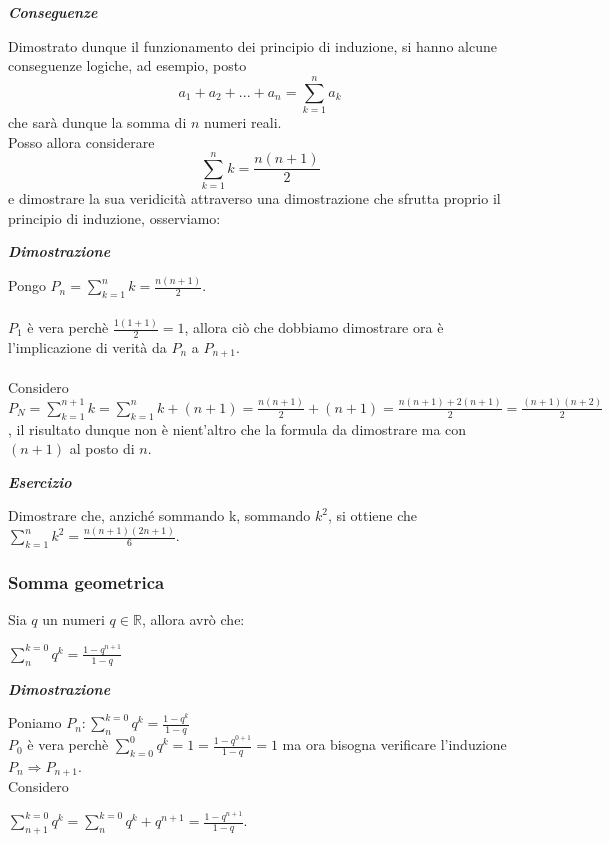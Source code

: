 \documentclass{article}
\theoremstyle{definition}
\begin{document}
\begin{center}
    \textbf{\textit{Conseguenze}}
\end{center}
Dimostrato dunque il funzionamento dei principio di induzione, si hanno alcune conseguenze logiche, ad esempio, posto
\begin{equation}
   a_1+a_2+...+a_n = \sum^n_{k=1}a_k
\end{equation}
che sarà dunque la somma di $n$ numeri reali.
\\ Posso allora considerare
\begin{equation}
    \sum^n_{k=1}k=\frac{n(n+1)}{2}
\end{equation}
e dimostrare la sua veridicità attraverso una dimostrazione che sfrutta proprio il principio di induzione, osserviamo:
\begin{center}
    \textbf{\textit{Dimostrazione}}
\end{center}
Pongo $P_n=\sum^n_{k=1}k=\frac{n(n+1)}{2}$.
\\
\\$P_1$ è vera perchè $\frac{1(1+1)}{2}=1$, allora ciò che dobbiamo dimostrare ora è l'implicazione di verità da $P_n$ a $P_{n+1}$.
\\
\\
Considero $P_N=\sum^{n+1}_{k=1}k=\sum^{n}_{k=1}k + (n+1)=\frac{n(n+1)}{2}+(n+1)=\frac{n(n+1)+2(n+1)}{2}=\frac{(n+1)(n+2)}{2}$, il risultato dunque non è nient'altro che la formula da dimostrare ma con $(n+1)$ al posto di $n$.
\newpage
\begin{center}
    \textbf{\textit{Esercizio}}
\end{center}
Dimostrare che, anziché sommando k, sommando $k^2$, si ottiene che $\sum^{n}_{k=1}k^2=\frac{n(n+1)(2n+1)}{6}$.

\subsubsection{Somma geometrica}
Sia $q$ un numeri $q \in \mathbb{R}$, allora avrò che:
\\
\begin{center}
$\sum^{k=0}_{n}q^k=\frac{1-q^{n+1}}{1-q}$
\end{center}

\begin{center}
    \textbf{\textit{Dimostrazione}}
\end{center}
Poniamo $P_n: \sum^{k=0}_{n}q^k=\frac{1-q^k}{1-q}$
\\
$P_0$ è vera perchè $\sum_{k=0}^0 q^k =1=\frac{1-q^{0+1}}{1-q}=1$ ma ora bisogna verificare l'induzione $P_n \Longrightarrow P_{n+1}$.
\\
Considero 
\begin{center}
$\sum^{k=0}_{n+1}q^k=\sum^{k=0}_{n}q^k+q^{n+1}=\frac{1-q^{n+1}}{1-q}$.
\end{center}
\end{document}
